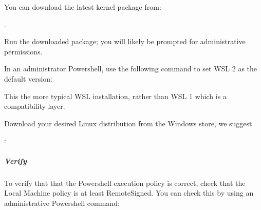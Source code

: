\documentclass[letterpaper,11pt,english]{sphinxmanual}
\begin{document}
\sphinxAtStartPar
{}

\sphinxAtStartPar
You can download the latest kernel package from:
%
\begin{footnote}[34]\sphinxAtStartFootnote
{}
%
\end{footnote}.

\sphinxAtStartPar
Run the downloaded package; you will likely be prompted for administrative
permissions.

\sphinxAtStartPar
{}

\sphinxAtStartPar
In an administrator Powershell, use the following command to set WSL 2 as the
default version:

\begin{sphinxVerbatim}[commandchars=\\\{\}]
  
\end{sphinxVerbatim}

\sphinxAtStartPar
This the more typical WSL installation, rather than WSL 1 which is a
compatibility layer.

\sphinxAtStartPar
{}

\sphinxAtStartPar
Download your desired Linux distribution from the Windows store, we
suggest %
\begin{footnote}[35]\sphinxAtStartFootnote
{}
%
\end{footnote}:


\subparagraph{Verify}
\label{\detokenize{technical/installation/windows:verify}}
\sphinxAtStartPar
To verify that that the Powershell execution policy is correct, check that
the Local Machine policy is at least RemoteSigned. You can check this by using
an administrative Powershell command:

\begin{sphinxVerbatim}[commandchars=\\\{\}]
 
\end{sphinxVerbatim}
\end{document}
